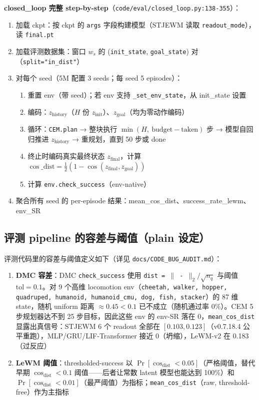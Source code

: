\documentclass[11pt,a4paper]{article}
\begin{document}
\textbf{closed\_loop 完整 step-by-step}（\texttt{code/eval/closed\_loop.py:138-355}）：
\begin{enumerate}[leftmargin=2em]
    \item 加载 ckpt：按 ckpt 的 \texttt{args} 字段构建模型（STJEWM 读取 \texttt{readout\_mode}），读 \texttt{final.pt}
    \item 加载评测数据集：窗口 $w_s$ 的 (\texttt{init\_state}, \texttt{goal\_state}) 对（\texttt{split="in\_dist"}）
    \item 对每个 seed（5M 配置 3 seeds；每 seed 5 episodes）：
    \begin{enumerate}
        \item 重置 env（带 seed）；若 env 支持 \texttt{\_set\_env\_state}，从 init\_state 设置
        \item 编码：$z_\text{history}$（$H$ 份 $z_{\text{init}}$）、$z_\text{goal}$（均为零动作编码）
        \item 循环：\texttt{CEM.plan} → 整块执行 $\min(H,\ \text{budget}-\text{taken})$ 步 → 模型自回归推进 $z_\text{history}$ → 重规划，直到 50 步或 done
        \item 终止时编码真实最终状态 $z_\text{final}$，计算 $\cos\text{\_dist} = \tfrac{1}{2}(1 - \cos(z_\text{final}, z_\text{goal}))$
        \item 计算 \texttt{env.check\_success}（env-native）
    \end{enumerate}
    \item 聚合所有 seed 的 per-episode 结果：mean\_cos\_dist、success\_rate\_lewm、env\_SR
\end{enumerate}

\subsection{评测 pipeline 的容差与阈值（plain 设定）}

评测代码里的容差与阈值定义如下（详见 \texttt{docs/CODE\_BUG\_AUDIT.md}）：

\begin{enumerate}[leftmargin=2em]
    \item \textbf{DMC 容差}：DMC \texttt{check\_success} 使用 \texttt{dist = $\|$ - $\|_2 / \sqrt{n_q}$} 与阈值 $\text{tol}=0.1$。对 9 个高维 locomotion env（\texttt{cheetah, walker, hopper, quadruped, humanoid, humanoid\_cmu, dog, fish, stacker}）的 87 维 state，随机 uniform 距离 $\approx 0.45 < 0.1$ 已不成立（随机通过率 0\%）。CEM 5 步规划器达不到 25 步目标，因此这些 env 的 env-SR 落在 0，\texttt{mean\_cos\_dist} 显露出真信号：STJEWM 6 个 readout 全部在 $[0.103, 0.123]$（v0.7.18.4 公平重跑），MLP/GRU/LIF-Transformer 接近 0（坍缩），LeWM-v2 在 0.183（过反应）
    \item \textbf{LeWM 阈值}：thresholded-success 以 $\Pr[\cos_\text{dist} < 0.05]$（严格阈值，替代早期 $\cos_\text{dist} < 0.1$ 阈值——后者让常数 latent 模型也能达到 100\%）和 $\Pr[\cos_\text{dist} < 0.01]$（最严阈值）为指标；\texttt{mean\_cos\_dist}（raw, threshold-free）作为主指标
\end{enumerate}
\end{document}
